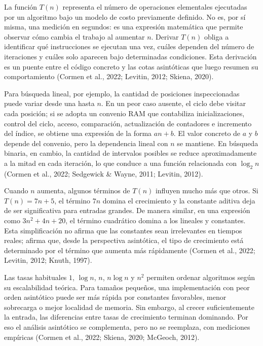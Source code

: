 La función $T(n)$ representa el número de operaciones elementales ejecutadas por un algoritmo bajo un modelo de costo previamente definido. No es, por sí misma, una medición en segundos: es una expresión matemática que permite observar cómo cambia el trabajo al aumentar $n$. Derivar $T(n)$ obliga a identificar qué instrucciones se ejecutan una vez, cuáles dependen del número de iteraciones y cuáles solo aparecen bajo determinadas condiciones. Esta derivación es un puente entre el código concreto y las cotas asintóticas que luego resumen su comportamiento (Cormen et al., 2022; Levitin, 2012; Skiena, 2020).

Para búsqueda lineal, por ejemplo, la cantidad de posiciones inspeccionadas puede variar desde una hasta $n$. En un peor caso ausente, el ciclo debe visitar cada posición; si se adopta un convenio RAM que contabiliza inicializaciones, control del ciclo, acceso, comparación, actualización de contadores e incremento del índice, se obtiene una expresión de la forma $an+b$. El valor concreto de $a$ y $b$ depende del convenio, pero la dependencia lineal con $n$ se mantiene. En búsqueda binaria, en cambio, la cantidad de intervalos posibles se reduce aproximadamente a la mitad en cada iteración, lo que conduce a una función relacionada con $\log_2 n$ (Cormen et al., 2022; Sedgewick \& Wayne, 2011; Levitin, 2012).

Cuando $n$ aumenta, algunos términos de $T(n)$ influyen mucho más que otros. Si $T(n)=7n+5$, el término $7n$ domina el crecimiento y la constante aditiva deja de ser significativa para entradas grandes. De manera similar, en una expresión como $3n^2+4n+20$, el término cuadrático domina a los lineales y constantes. Esta simplificación no afirma que las constantes sean irrelevantes en tiempos reales; afirma que, desde la perspectiva asintótica, el tipo de crecimiento está determinado por el término que aumenta más rápidamente (Cormen et al., 2022; Levitin, 2012; Knuth, 1997).

Las tasas habituales $1$, $\log n$, $n$, $n\log n$ y $n^2$ permiten ordenar algoritmos según su escalabilidad teórica. Para tamaños pequeños, una implementación con peor orden asintótico puede ser más rápida por constantes favorables, menor sobrecarga o mejor localidad de memoria. Sin embargo, al crecer suficientemente la entrada, las diferencias entre tasas de crecimiento terminan dominando. Por eso el análisis asintótico se complementa, pero no se reemplaza, con mediciones empíricas (Cormen et al., 2022; Skiena, 2020; McGeoch, 2012).

